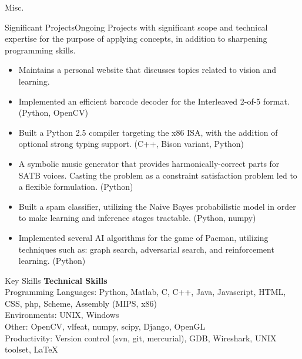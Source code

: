 \documentclass{resume}
\begin{document}
\begin{component}{Misc.}
	\begin{position}{Significant Projects}{Ongoing}
		{}{\vspace{-1.0em}}
	{Projects with significant scope and technical expertise for the purpose of applying concepts, in addition to
	sharpening programming skills.}

	\begin{itemize}
        \vspace{-0.5em}\item Maintains a personal website that discusses topics related to vision and learning.
        \vspace{-0.5em}\item Implemented an efficient barcode decoder
        for the Interleaved 2-of-5 format. (Python, OpenCV)
		\vspace{-0.5em}\item Built a Python 2.5 compiler targeting the x86 ISA, with the addition of
		optional strong typing support. (C++, Bison variant, Python)
		\vspace{-0.5em}\item A symbolic music generator that provides harmonically-correct
		parts for SATB voices. Casting the problem as a constraint
        satisfaction problem led to a flexible formulation.
		(Python)
		\vspace{-0.5em}\item Built a spam classifier, utilizing the Naive Bayes probabilistic model in order to make
		learning and inference stages tractable. (Python, numpy)
		\vspace{-0.5em}\item Implemented several AI algorithms for the game of Pacman, utilizing
		techniques such as: graph search, adversarial search, and reinforcement learning. (Python)
	\end{itemize}
	\end{position}
\end{component}

\vspace{-2.0em}

\begin{component}{Key Skills}
	\textbf{Technical Skills}\\
		Programming Languages: Python, Matlab, C, C++, Java, Javascript, HTML, CSS, php, Scheme, Assembly (MIPS, x86)\\
		Environments: UNIX, Windows\\
		Other: OpenCV, vlfeat, numpy, scipy, Django, OpenGL \\
		Productivity: Version control (svn, git, mercurial), GDB, Wireshark, UNIX toolset, LaTeX
\end{component}
\end{document}
